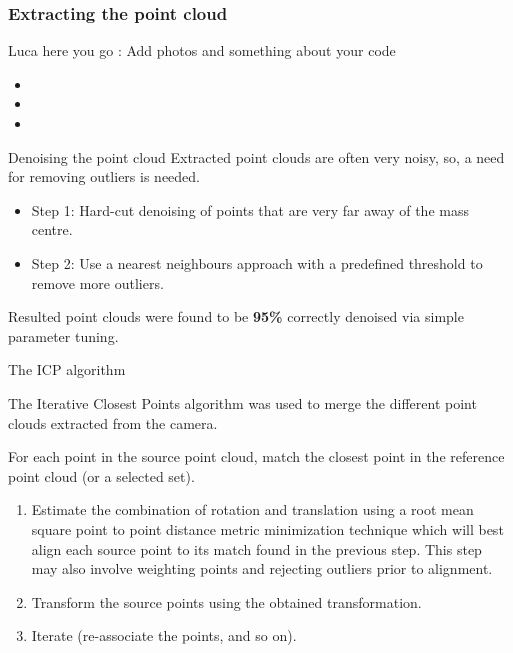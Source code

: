 \documentclass{beamer}
\begin{document}
\begin{frame}\frametitle{Extracting the point cloud}

Luca here you go : Add photos and something about your code

\begin{itemize}
	\item 
	\item  
	\item 
\end{itemize}


\end{frame}

\begin{frame}{Denoising the point cloud}
Extracted point clouds are often very noisy, so, a need for removing outliers is needed.

\begin{itemize}
	\item Step 1: Hard-cut denoising of points that are very far away of the mass centre.
	\item Step 2: Use a nearest neighbours approach with a predefined threshold to remove more outliers. 
\end{itemize}

Resulted point clouds were found to be \textbf{95\%} correctly denoised via simple parameter tuning.



\end{frame}

\begin{frame}{The ICP algorithm}

{\small The Iterative Closest Points algorithm was used to merge the different point clouds extracted from the camera.

For each point in the source point cloud, match the closest point in the reference point cloud (or a selected set).
\begin{enumerate}
	\item Estimate the combination of rotation and translation using a root mean square point to point distance metric minimization technique which will best align each source point to its match found in the previous step. This step may also involve weighting points and rejecting outliers prior to alignment.
	\item Transform the source points using the obtained transformation.
	\item Iterate (re-associate the points, and so on).
\end{enumerate}}
\end{frame}
\end{document}
